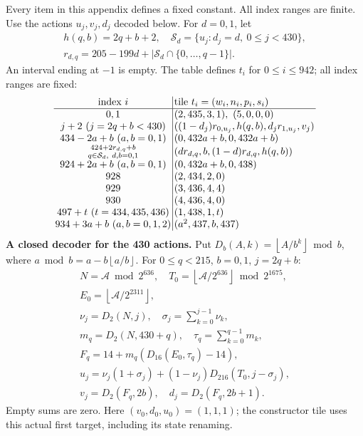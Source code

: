 \providecommand{\fl}[1]{\left\lfloor#1\right\rfloor}
\providecommand{\rg}[2]{\{#1,\ldots,#2\}}
Every item in this appendix defines a fixed constant. All index ranges are finite.
Use the actions $u_j,v_j,d_j$ decoded below. For $d=0,1$, let
\[
\begin{gathered}
h(q,b)=2q+b+2,\quad
\mathcal S_d=\{u_j:d_j=d,\ 0\le j<430\},\\
r_{d,q}=205-199d+|\mathcal S_d\cap\rg0{q-1}|.
\end{gathered}
\]
An interval ending at $-1$ is empty. The table defines $t_i$ for
$0\le i\le942$; all index ranges are fixed:
\[
\setlength{\arraycolsep}{1.4pt}\begin{array}{c|l}
\text{index }i&\text{tile }t_i=(w_i,n_i,p_i,s_i)\\\hline
0,1&(2,435,3,1),\ (5,0,0,0)\\
j+2\ (j=2q+b<430)&((1-d_j)r_{0,u_j},h(q,b),d_jr_{1,u_j},v_j)\\
434-2a+b\ (a,b=0,1)&(0,432a+b,0,432a+b)\\
\substack{424+2r_{d,q}+b\\q\in\mathcal S_d,\ d,b=0,1}&(dr_{d,q},b,(1-d)r_{d,q},h(q,b))\\
924+2a+b\ (a,b=0,1)&(0,432a+b,0,438)\\
928&(2,434,2,0)\\
929&(3,436,4,4)\\
930&(4,436,4,0)\\
497+t\ (t=434,435,436)&(1,438,1,t)\\
934+3a+b\ (a,b=0,1,2)&(a^2,437,b,437)
\end{array}
\]
\textbf{A closed decoder for the 430 actions.}
Put $D_b(A,k)=\fl{A/b^k}\bmod b$, where
$a\bmod b=a-b\fl{a/b}$. For $0\le q<215$, $b=0,1$, $j=2q+b$:
\[
\begin{gathered}
N=\mathcal A\bmod2^{636},\quad
T_0=\fl{\mathcal A/2^{636}}\bmod2^{1675},\\
E_0=\fl{\mathcal A/2^{2311}},\\
\nu_j=D_2(N,j),\quad \sigma_j=\sum_{k=0}^{j-1}\nu_k,\\
m_q=D_2(N,430+q),\quad \tau_q=\sum_{k=0}^{q-1}m_k,\\
F_q=14+m_q(D_{16}(E_0,\tau_q)-14),\\
u_j=\nu_j(1+\sigma_j)+(1-\nu_j)D_{216}(T_0,j-\sigma_j),\\
v_j=D_2(F_q,2b),\quad d_j=D_2(F_q,2b+1).
\end{gathered}
\]
Empty sums are zero. Here $(v_0,d_0,u_0)=(1,1,1)$; the constructor tile
uses this actual first target, including its state renaming.

